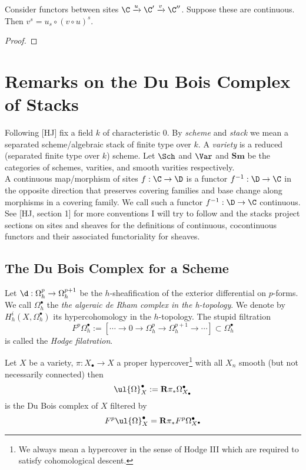 \documentclass[12pt]{article}
\begin{document}
\begin{prop}
Consider functors between sites $\C \xrightarrow{u} \C' \xrightarrow{v} \C''$. Suppose these are continuous. Then $v^s = u_s \circ (v \circ u)^s$.
\end{prop}

\begin{proof}

\end{proof}

\section{Remarks on the Du Bois Complex of Stacks}

\newcommand{\Sm}{\mathbf{Sm}}

Following [HJ] fix a field $k$ of characteristic $0$. By \textit{scheme} and \textit{stack} we mean a separated scheme/algebraic stack of finite type over $k$. A \textit{variety} is a reduced (separated finite type over $k$) scheme. Let $\Sch$ and $\Var$ and $\Sm$ be the categories of schemes, varities, and smooth varities respectively. 
\bigskip\\
A continuous map/morphism of sites $f : \C \to \D$ is a functor $f^{-1} : \D \to \C$ in the opposite direction that preserves covering families and base change along morphisms in a covering family. We call such a functor $f^{-1} : \D \to \C$ continuous. 
\bigskip\\
See [HJ, section 1] for more conventions I will try to follow and the stacks project sections on sites and sheaves for the definitions of continuous, cocontinuous functors and their associated functoriality for sheaves.

\subsection{The Du Bois Complex for a Scheme}

Let $\d : \Omega^p_h \to \Omega^{p+1}_h$ be the $h$-sheafification of the exterior differential on $p$-forms. We call $\Omega_h^\bullet$ the \textit{the algeraic de Rham complex in the h-topology}. We denote by $H_h^i(X, \Omega^\bullet_h)$ its hypercohomology in the $h$-topology. The stupid filtration
\[ F^p \Omega^\bullet_h := [ \cdots \to 0 \to \Omega^p_h \to \Omega_h^{p+1} \to \cdots] \subset \Omega^\bullet_h \]
is called the \textit{Hodge filatration}.



\begin{defn}
Let $X$ be a variety, $\pi : X_\bullet \to X$ a proper hypercover\footnote{We always mean a hypercover in the sense of Hodge III which are required to satisfy cohomological descent.} with all $X_n$ smooth (but not necessarily connected) then
\[ \ul{\Omega}_X^\bullet := \R \pi_* \Omega^\bullet_{X_\bullet} \]
is the Du Bois complex of $X$ filtered by
\[ F^p \ul{\Omega}_X^{\bullet} = \R \pi_* F^p \Omega^\bullet_{X^\bullet} \]
\end{defn}
\end{document}
